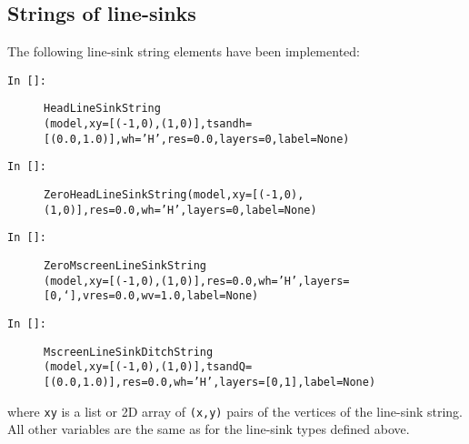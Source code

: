 \documentclass [10pt,letterpaper] {article}
\begin{document}
\subsection{Strings of line-sinks}
The following line-sink string elements have been implemented:
\begin{description}
\item[{\tt In []:}]{\tt HeadLineSinkString}\\{\tt (model,xy=[(-1,0),(1,0)],tsandh=[(0.0,1.0)],wh='H',res=0.0,layers=0,label=None)}
\item[{\tt In []:}]{\tt ZeroHeadLineSinkString(model,xy=[(-1,0),(1,0)],res=0.0,wh='H',layers=0,label=None)}
\item[{\tt In []:}]{\tt ZeroMscreenLineSinkString}\\{\tt (model,xy=[(-1,0),(1,0)],res=0.0,wh='H',layers=[0,`],vres=0.0,wv=1.0,label=None)}
\item[{\tt In []:}]{\tt MscreenLineSinkDitchString}\\{\tt (model,xy=[(-1,0),(1,0)],tsandQ=[(0.0,1.0)],res=0.0,wh='H',layers=[0,1],label=None)}
\end{description}
where {\tt xy} is a list or 2D array of {\tt (x,y)} pairs of the vertices of the line-sink string. All other variables are the same as for the line-sink types defined above. 
\end{document}
